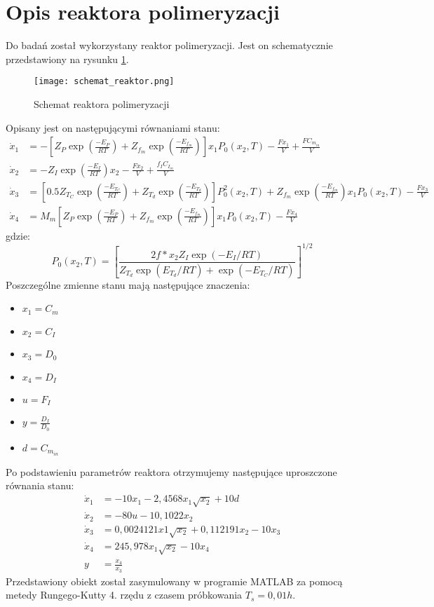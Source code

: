 \section{Opis reaktora polimeryzacji}
Do badań został wykorzystany reaktor polimeryzacji. Jest on schematycznie przedstawiony na rysunku \ref{fig:schemat_reaktor}.
\begin{figure}[H]
	\centering \texttt{[image: schemat\_reaktor.png]}
	\caption{Schemat reaktora polimeryzacji}
	\label{fig:schemat_reaktor}
\end{figure}
Opisany jest on następującymi równaniami stanu:
\begin{equation}
\begin{split}
\dot{x}_1 &= - \left[Z_P\exp\left(\frac{-E_P}{RT}\right) + Z_{f_m}\exp\left(\frac{-E_{f_m}}{RT}\right)\right]x_1P_0(x_2, T) - \frac{Fx_1}{V} + \frac{FC_{m_{in}}}{V} \\
\dot{x}_2 &= - Z_I\exp\left(\frac{-E_I}{RT}\right)x_2 - \frac{Fx_2}{V} + \frac{f_IC_{I_{in}}}{V} \\
\dot{x}_3 &= \left[0.5Z_{T_C}\exp\left(\frac{-E_{T_C}}{RT}\right) + Z_{T_d}\exp\left(\frac{-E_{T_d}}{RT}\right)\right]P_0^2(x_2, T) + Z_{f_m} \exp\left(\frac{-E_{f_m}}{RT}\right) x_1P_0(x_2, T) - \frac{Fx_3}{V} \\
\dot{x}_4 &= M_m\left[Z_P\exp\left(\frac{-E_P}{RT}\right) + Z_{f_m}\exp\left(\frac{-E_{f_m}}{RT}\right)\right]x_1P_0(x_2, T) - \frac{Fx_4}{V}
\end{split}
\end{equation}
gdzie:
\begin{equation}
P_0(x_2, T) = \left[\frac{2f*x_2Z_I\exp(-E_I/RT)}{Z_{T_d}\exp(E_{T_d}/RT)+\exp(-E_{T_C}/RT)}\right]^{1/2}
\end{equation}
Poszczególne zmienne stanu mają następujące znaczenia:
\begin{itemize}
	\item $x_1 = C_m$
	\item $x_2 = C_I$
	\item $x_3 = D_0$
	\item $x_4 = D_I$
	\item $u = F_I$
	\item $y = \frac{D_I}{D_0}$
	\item $d = C_{m_{in}}$
\end{itemize}
Po podstawieniu parametrów reaktora otrzymujemy następujące uproszczone równania stanu:
\begin{equation}
\begin{split}
\dot{x}_1 &= -10x_1 - 2,4568x_1\sqrt{x_2} + 10d\\
\dot{x}_2 &= - 80u - 10,1022x_2\\
\dot{x}_3 &= 0,0024121x1\sqrt{x_2} + 0,112191x_2 - 10x_3 \\
\dot{x}_4 &= 245,978x_1\sqrt{x_2} - 10x_4 \\
y &= \frac{x_4}{x_3}
\end{split}
\end{equation}
Przedstawiony obiekt został zasymulowany w programie MATLAB za pomocą metedy Rungego-Kutty 4. rzędu z czasem próbkowania $T_s = 0,01h$.